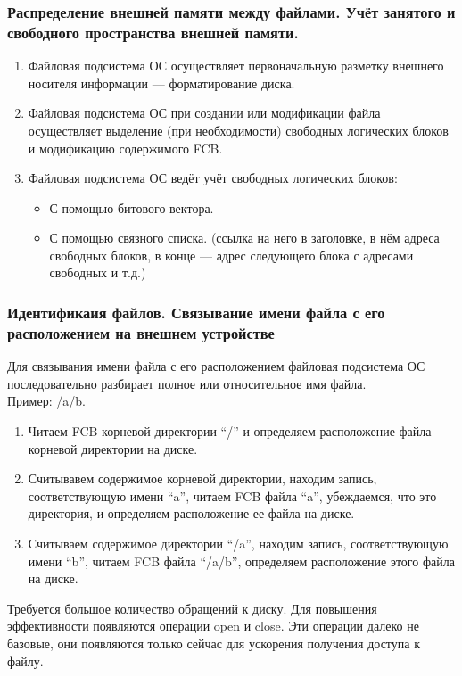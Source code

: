 \documentclass[12pt, a4paper]{article}
\begin{document}
    \subsubsection {Распределение внешней памяти между файлами. Учёт занятого и свободного пространства внешней памяти.}
    \begin{enumerate}
        \item Файловая подсистема ОС осуществляет первоначальную разметку внешнего носителя информации --- форматирование диска.
        \item Файловая подсистема ОС при создании или модификации файла осуществляет выделение (при необходимости) свободных логических блоков и модификацию содержимого FCB.
        \item Файловая подсистема ОС ведёт учёт свободных логических блоков:
        \begin{itemize}
            \item С помощью битового вектора.
            \item С помощью связного списка. (ссылка на него в заголовке, в нём адреса свободных блоков, в конце --- адрес следующего блока с адресами свободных и т.д.)
        \end{itemize}
    \end{enumerate}
    \subsubsection {Идентификаия файлов. Связывание имени файла с его расположением на внешнем устройстве}
    Для связывания имени файла с его расположением файловая подсистема ОС последовательно разбирает полное или относительное имя файла.\\
    Пример: /a/b.
    \begin{enumerate}
        \item Читаем FCB корневой директории ``/'' и определяем расположение файла корневой директории на диске.
        \item Считывавем содержимое корневой директории, находим запись, соответствующую имени ``a'', читаем FCB файла ``a'', убеждаемся, что это директория, и определяем расположение ее файла на диске.
        \item Считываем содержимое директории ``/a'', находим запись, соответствующую имени ``b'', читаем FCB файла ``/a/b'', определяем расположение этого файла на диске.\\
    \end{enumerate}
    Требуется большое количество обращений к диску. Для повышения эффективности появляются операции open и close. Эти операции далеко не базовые, они появляются только сейчас для ускорения получения доступа к файлу.
\end{document}
